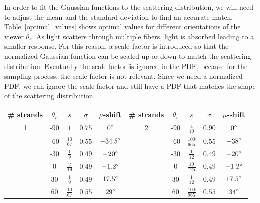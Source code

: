 \documentclass[11pt,a4paper]{report}
\begin{document}
In order to fit the Gaussian functions to the scattering distribution, we will need to adjust the mean and the standard deviation to find an accurate match. Table~\ref{optimal_values} shows optimal values for different orientations of the viewer $\theta_r$. As light scatters through multiple fibers, light is absorbed leading to a smaller response. For this reason, a scale factor is introduced so that the normalized Gaussian function can be scaled up or down to match the scattering distribution. Eventually the scale factor is ignored in the PDF, because for the sampling process, the scale factor is not relevant. Since we need a normalized PDF, we can ignore the scale factor and still have a PDF that matches the shape of the scattering distribution.

\begin{table}[h]
\begin{center}
\begin{tabular}{|cc|c|c|c||cc|c|c|c|}
\hline
\# strands & $\theta_r$ & $s$ & $\sigma$ & $\mu$-shift  & \# strands & $\theta_r$ & $s$ & $\sigma$ & $\mu$-shift\\ \hline \hline
1 & -90 & $1$ & $0.75$ & $0 \degree$					& 2 & -90 & $\frac{4}{10}$ & $0.90$ & $0\degree$ \\
  & -60 & $\frac{10}{67}$ & $0.55$ & $-34.5 \degree$ 	&  & -60 & $\frac{100}{965}$ & $0.55$ & $-38\degree$ \\
  & -30 & $\frac{1}{9}$ & $0.49$ & $-20 \degree$ 		&  & -30 & $\frac{1}{12}$ & $0.49$ & $-20\degree$ \\
 & 0 & $\frac{2}{19}$ & $0.49$ & $-1.2\degree$ 			&  & 0 & $\frac{10}{125}$ & $0.49$ & $-1.2\degree$ \\
 & 30 & $\frac{1}{9}$ & $0.49$ & $17.5 \degree$ 			&  & 30 & $\frac{1}{12}$ & $0.49$ & $17.5\degree$ \\

   & 60 & $\frac{10}{67}$ & $0.55$ & $29 \degree$ 		&  & 60 & $\frac{100}{965}$ & $0.55$ & $34\degree$ \\


\end{tabular}
\end{center}
\end{table}
\end{document}
